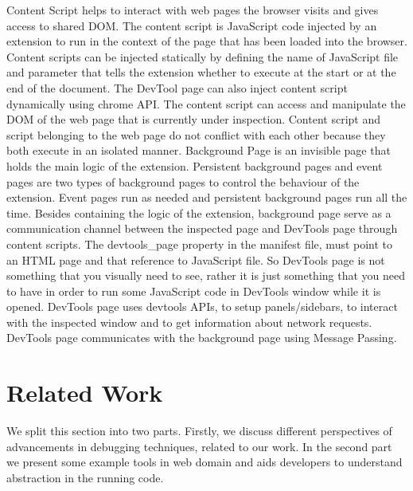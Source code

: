 Content Script helps to interact with web pages the browser visits and gives access to shared DOM. The content script is JavaScript code injected by an extension to run in the context of the page that has been loaded into the browser. Content scripts can be injected statically by defining the name of JavaScript file and parameter that tells the extension whether to execute at the start or at the end of the document. The DevTool page can also inject content script dynamically using chrome API. The content script can access and manipulate the DOM of the web page that is currently under inspection. Content script and script belonging to the web page do not conflict with each other because they both execute in an isolated manner.
Background Page is an invisible page that holds the main logic of the extension. Persistent background pages and event pages are two types of background pages to control the behaviour of the extension. Event pages run as needed and persistent background pages run all the time. Besides containing the logic of the extension, background page serve as a communication channel between the inspected page and DevTools page through content scripts.  
The devtools\_page property in the manifest file, must point to an HTML page and that reference to JavaScript file. So DevTools page is not something that you visually need to see, rather it is just something that you need to have in order to run some JavaScript code in DevTools window while it is opened. DevTools page uses devtools APIs, to setup panels/sidebars, to interact with the inspected window and to get information about network requests. DevTools page communicates with the background page using Message Passing.

\section{Related Work}
We split this section into two parts. Firstly, we discuss different perspectives of advancements in debugging techniques, related to our work. In the second part we present some example tools in web domain and aids developers to understand abstraction in the running code.
